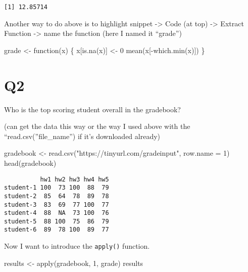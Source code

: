 \documentclass[
  letterpaper,
  DIV=11,
  numbers=noendperiod]{scrartcl}
\newenvironment{Shaded}{\begin{snugshade}}{\end{snugshade}}
\newcommand{\AttributeTok}[1]{\textcolor[rgb]{0.40,0.45,0.13}{#1}}
\newcommand{\ControlFlowTok}[1]{\textcolor[rgb]{0.00,0.23,0.31}{#1}}
\newcommand{\DecValTok}[1]{\textcolor[rgb]{0.68,0.00,0.00}{#1}}
\newcommand{\FunctionTok}[1]{\textcolor[rgb]{0.28,0.35,0.67}{#1}}
\newcommand{\NormalTok}[1]{\textcolor[rgb]{0.00,0.23,0.31}{#1}}
\newcommand{\OtherTok}[1]{\textcolor[rgb]{0.00,0.23,0.31}{#1}}
\newcommand{\SpecialCharTok}[1]{\textcolor[rgb]{0.37,0.37,0.37}{#1}}
\newcommand{\StringTok}[1]{\textcolor[rgb]{0.13,0.47,0.30}{#1}}
\begin{document}
\begin{verbatim}
[1] 12.85714
\end{verbatim}

Another way to do above is to highlight snippet -\textgreater{} Code (at
top) -\textgreater{} Extract Function -\textgreater{} name the function
(here I named it ``grade'')

\begin{Shaded}
\begin{Highlighting}[]
\NormalTok{grade }\OtherTok{\textless{}{-}} \ControlFlowTok{function}\NormalTok{(x) \{}
\NormalTok{  x[}\FunctionTok{is.na}\NormalTok{(x)] }\OtherTok{\textless{}{-}} \DecValTok{0}
  \FunctionTok{mean}\NormalTok{(x[}\SpecialCharTok{{-}}\FunctionTok{which.min}\NormalTok{(x)])}
\NormalTok{\}}
\end{Highlighting}
\end{Shaded}

\hypertarget{q2}{%
\section{\texorpdfstring{\textbf{Q2}}{Q2}}\label{q2}}

Who is the top scoring student overall in the gradebook?

(can get the data this way or the way I used above with the
``read.csv(''file\_name'') if it's downloaded already)

\begin{Shaded}
\begin{Highlighting}[]
\NormalTok{gradebook }\OtherTok{\textless{}{-}} \FunctionTok{read.csv}\NormalTok{(}\StringTok{"https://tinyurl.com/gradeinput"}\NormalTok{,}
\AttributeTok{row.name =} \DecValTok{1}\NormalTok{)}
\FunctionTok{head}\NormalTok{(gradebook)}
\end{Highlighting}
\end{Shaded}

\begin{verbatim}
          hw1 hw2 hw3 hw4 hw5
student-1 100  73 100  88  79
student-2  85  64  78  89  78
student-3  83  69  77 100  77
student-4  88  NA  73 100  76
student-5  88 100  75  86  79
student-6  89  78 100  89  77
\end{verbatim}

Now I want to introduce the \texttt{apply()} function.

\begin{Shaded}
\begin{Highlighting}[]
\NormalTok{results }\OtherTok{\textless{}{-}} \FunctionTok{apply}\NormalTok{(gradebook, }\DecValTok{1}\NormalTok{, grade)}
\NormalTok{results}
\end{Highlighting}
\end{Shaded}
\end{document}
